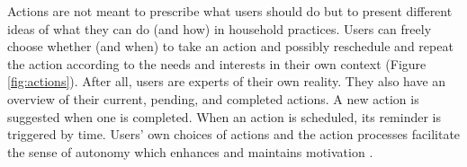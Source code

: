 Actions are not meant to prescribe what users should do but to present different ideas of what they can do (and how) in household practices. 
Users can freely choose whether (and when) to take an action and possibly reschedule and repeat the action according to the needs and interests in their own context (Figure \ref{fig:actions}). After all, users are experts of their own reality. They also have an overview of their current, pending, and completed actions.
A new action is suggested when one is completed. %
When an action is scheduled, its reminder is triggered by time. Users' own choices of actions and the action processes facilitate the sense of autonomy which enhances and maintains motivation \cite{Ryan2000}.

